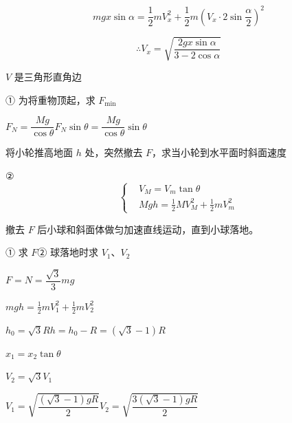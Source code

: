\[
mgx\sin\alpha=\frac12mV_x^{2}+\frac12m\left(V_x\cdot2\sin\frac{\alpha}{2}\right)^{2}
\]

\[
\therefore V_x=\sqrt{\frac{2gx\sin\alpha}{3-2\cos\alpha}}
\]
\begin{keybox}[几何关联]%
$V$ 是三角形直角边
\end{keybox}
\begin{problem}[{[1]}]
① 为将重物顶起，求 $F_{\min}$

\noindent $F_N=\dfrac{Mg}{\cos\theta}$\qquad $F_N\sin\theta=\dfrac{Mg}{\cos\theta}\sin\theta$

\noindent 将小轮推高地面 $h$ 处，突然撤去 $F$，求当小轮到水平面时斜面速度

\noindent ②
\[
\left\{\begin{aligned}
&V_M=V_m\tan\theta\\
&Mgh=\tfrac12MV_M^{2}+\tfrac12mV_m^{2}
\end{aligned}\right.
\]
\end{problem}
\begin{problem}[{[2]}]
撤去 $F$ 后小球和斜面体做匀加速直线运动，直到小球落地。

\noindent ① 求 $F$\quad ② 球落地时求 $V_1$、$V_2$

\noindent $F=N=\dfrac{\sqrt3}{3}mg$

\noindent $mgh=\tfrac12mV_1^{2}+\tfrac12mV_2^{2}$

\noindent $h_0=\sqrt3R$\quad $h=h_0-R=(\sqrt3-1)R$

\noindent $x_1=x_2\tan\theta$

\noindent $V_2=\sqrt3V_1$

\noindent $V_1=\sqrt{\dfrac{(\sqrt3-1)gR}{2}}$\quad $V_2=\sqrt{\dfrac{3(\sqrt3-1)gR}{2}}$
\end{problem}

